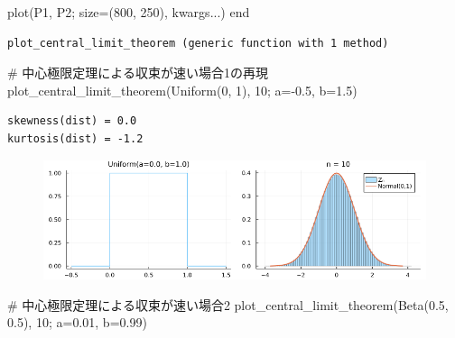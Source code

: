 \documentclass[
  letterpaper,
  DIV=11,
  numbers=noendperiod]{scrartcl}
\newenvironment{Shaded}{\begin{snugshade}}{\end{snugshade}}
\newcommand{\CommentTok}[1]{\textcolor[rgb]{0.37,0.37,0.37}{#1}}
\newcommand{\FloatTok}[1]{\textcolor[rgb]{0.68,0.00,0.00}{#1}}
\newcommand{\FunctionTok}[1]{\textcolor[rgb]{0.28,0.35,0.67}{#1}}
\newcommand{\KeywordTok}[1]{\textcolor[rgb]{0.00,0.23,0.31}{#1}}
\newcommand{\NormalTok}[1]{\textcolor[rgb]{0.00,0.23,0.31}{#1}}
\newcommand{\OperatorTok}[1]{\textcolor[rgb]{0.37,0.37,0.37}{#1}}
\begin{document}
\begin{Shaded}
\begin{Highlighting}[]
    \FunctionTok{plot}\NormalTok{(P1, P2; size}\OperatorTok{=}\NormalTok{(}\FloatTok{800}\NormalTok{, }\FloatTok{250}\NormalTok{), kwargs}\OperatorTok{...}\NormalTok{)}
\KeywordTok{end}
\end{Highlighting}
\end{Shaded}

\begin{verbatim}
plot_central_limit_theorem (generic function with 1 method)
\end{verbatim}

\begin{Shaded}
\begin{Highlighting}[]
\CommentTok{\# 中心極限定理による収束が速い場合1の再現}
\FunctionTok{plot\_central\_limit\_theorem}\NormalTok{(}\FunctionTok{Uniform}\NormalTok{(}\FloatTok{0}\NormalTok{, }\FloatTok{1}\NormalTok{), }\FloatTok{10}\NormalTok{; a}\OperatorTok{={-}}\FloatTok{0.5}\NormalTok{, b}\OperatorTok{=}\FloatTok{1.5}\NormalTok{)}
\end{Highlighting}
\end{Shaded}

\begin{verbatim}
skewness(dist) = 0.0
kurtosis(dist) = -1.2
\end{verbatim}

\begin{figure}[H]

{\centering \includegraphics{05 Central limit theorem_files/figure-pdf/cell-74-output-2.png}

}

\end{figure}

\begin{Shaded}
\begin{Highlighting}[]
\CommentTok{\# 中心極限定理による収束が速い場合2}
\FunctionTok{plot\_central\_limit\_theorem}\NormalTok{(}\FunctionTok{Beta}\NormalTok{(}\FloatTok{0.5}\NormalTok{, }\FloatTok{0.5}\NormalTok{), }\FloatTok{10}\NormalTok{; a}\OperatorTok{=}\FloatTok{0.01}\NormalTok{, b}\OperatorTok{=}\FloatTok{0.99}\NormalTok{)}
\end{Highlighting}
\end{Shaded}
\end{document}
